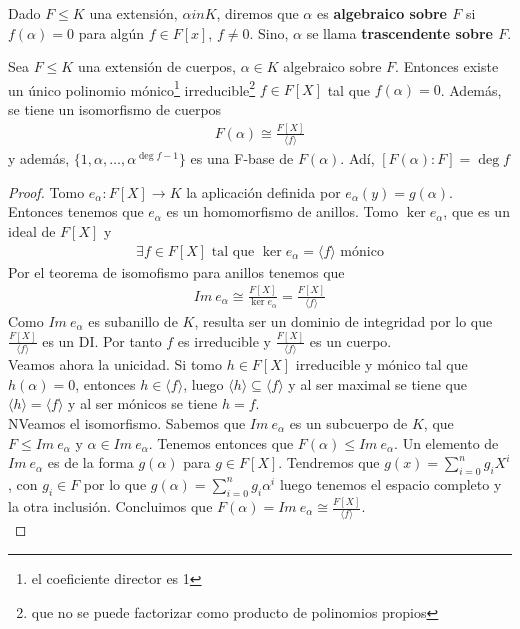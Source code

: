 \begin{definicion}
    Dado $F\leq K$ una extensión, $\alpha in K$, diremos que $\alpha$ es \textbf{algebraico sobre $F$} si $f(\alpha)=0$ para algún $f\in F[x]$, $f\neq 0$. Sino, $\alpha$ se llama \textbf{trascendente sobre $F$}.
\end{definicion}

\begin{prop}
    Sea $F\leq K$ una extensión de cuerpos, $\alpha \in K$ algebraico sobre $F$. Entonces existe un único polinomio mónico\footnote{el coeficiente director es 1} irreducible\footnote{que no se puede factorizar como producto de polinomios propios} $f\in F[X]$ tal que $f(\alpha)=0$. Además, se tiene un isomorfismo de cuerpos
    \begin{gather*}
        F(\alpha) \cong \frac{F[X]}{\langle f \rangle}
    \end{gather*}
    y además, $\{1, \alpha, \dots, \alpha^{\deg f -1}\}$ es una F-base de $F(\alpha)$. Adí, $[F(\alpha):F] = \deg f$

    \begin{proof}
        Tomo $e_\alpha : F[X] \to K$ la aplicación definida por $e_\alpha (y) = g(\alpha)$. Entonces tenemos que $e_\alpha$ es un homomorfismo de anillos. Tomo $\ker e_\alpha$, que es un ideal de $F[X]$ y 
        \begin{gather*}
            \exists f\in F[X] \text{ tal que } \ker e_\alpha = \langle f \rangle \text{ mónico}
        \end{gather*}
        Por el teorema de isomofismo para anillos tenemos que 
        \begin{gather*}
            Im\ e_\alpha \cong \frac{F[X]}{\ker e_\alpha} = \frac{F[X]}{\langle f \rangle}
        \end{gather*}
        Como $Im\ e_\alpha$ es subanillo de $K$, resulta ser un dominio de integridad por lo que $\frac{F[X]}{\langle f \rangle}$ es un DI. Por tanto $f$ es irreducible y $\frac{F[X]}{\langle f \rangle}$ es un cuerpo.\\

        Veamos ahora la unicidad. Si tomo $h\in F[X]$ irreducible y mónico tal que $h(\alpha) = 0$, entonces $h\in \langle f \rangle$, luego $\langle h \rangle \subseteq \langle f \rangle$ y al ser maximal se tiene que $\langle h \rangle = \langle f \rangle$ y al ser mónicos se tiene $h=f$.\\

        NVeamos el isomorfismo. Sabemos que $Im\ e_\alpha$ es un subcuerpo de $K$, que $F\leq Im\ e_\alpha$ y $\alpha \in Im\ e_\alpha$. Tenemos entonces que $F(\alpha) \leq Im\ e_\alpha$. Un elemento de $Im\ e_\alpha$ es de la forma $g(\alpha)$ para $g\in F[X]$. Tendremos que $g(x) = \sum\limits_{i=0}^n g_iX^i$, con $g_i\in F$ por lo que $g(\alpha) = \sum\limits_{i=0}^n g_i \alpha^i$ luego tenemos el espacio completo y la otra inclusión. Concluimos que $F(\alpha)=Im\ e_\alpha \cong \frac{F[X]}{\langle f \rangle}$.\\


\end{proof}
\end{prop}
